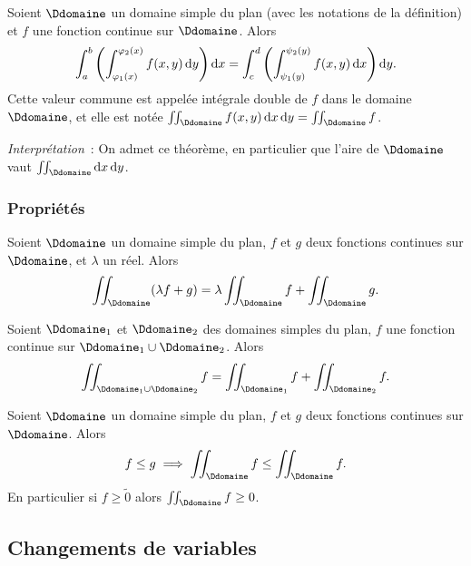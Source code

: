 \begin{defdef}
  Soient $\Ddomaine$ un domaine simple du plan (avec les notations de la définition) et $f$ une fonction continue sur $\Ddomaine$. Alors
  \begin{equation}
    \int_{a}^{b} \left( \int_{\varphi_1(x)}^{\varphi_2(x)} f(x,y)\mathop{}\mathopen{}\mathrm{d} y\right)\mathop{}\mathopen{}\mathrm{d} x = \int_{c}^{d} \left( \int_{\psi_1(y)}^{\psi_2(y)} f(x,y)\mathop{}\mathopen{}\mathrm{d} x\right)\mathop{}\mathopen{}\mathrm{d} y.
  \end{equation}
  Cette valeur commune est appelée intégrale double de $f$ dans le domaine $\Ddomaine$, et elle est notée $\iint_{\Ddomaine} f(x,y)\diff x \diff y = \iint_{\Ddomaine} f$.
\end{defdef}

\emph{Interprétation}~: On admet ce théorème, en particulier que l'aire de $\Ddomaine$ vaut $\iint_{\Ddomaine}\diff x \diff y$.

\subsubsection{Propriétés}

\begin{prop}[Linéarité]
  Soient $\Ddomaine$ un domaine simple du plan, $f$ et $g$ deux fonctions continues sur $\Ddomaine$, et $\lambda$ un réel. Alors
  \begin{equation}
    \iint_{\Ddomaine}(\lambda f+g) = \lambda \iint_{\Ddomaine} f + \iint_{\Ddomaine} g.
  \end{equation}
\end{prop}
\begin{prop}
  Soient $\Ddomaine_1$ et $\Ddomaine_2$ des domaines simples du plan, $f$ une fonction continue sur $\Ddomaine_1 \cup \Ddomaine_2$. Alors
  \begin{equation}
    \iint_{\Ddomaine_1 \cup \Ddomaine_2} f = \iint_{\Ddomaine_1} f + \iint_{\Ddomaine_2} f.
  \end{equation}
\end{prop}
\begin{prop}[Croissance]
  Soient $\Ddomaine$ un domaine simple du plan, $f$ et $g$ deux fonctions continues sur $\Ddomaine$. Alors
  \begin{equation}
    f \leq g \implies \iint_{\Ddomaine} f \leq \iint_{\Ddomaine} f.
  \end{equation}
  En particulier si $f \geq \tilde{0}$ alors $\iint_{\Ddomaine} f \geq 0$.
\end{prop}

\subsection{Changements de variables}

